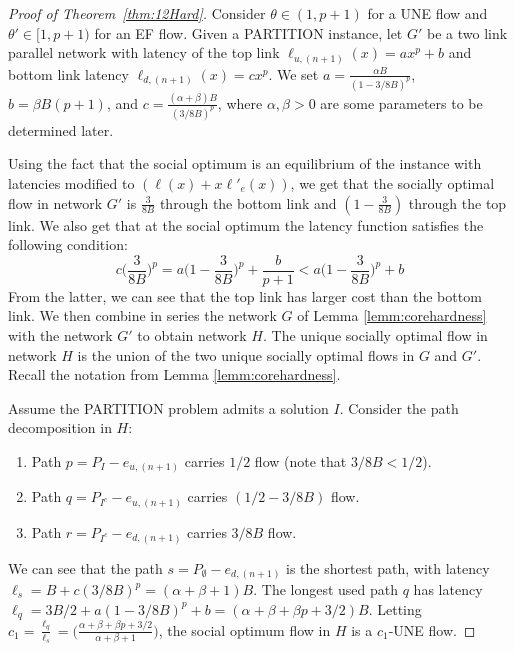 \begin{proof}[Proof of Theorem~\ref{thm:12Hard}]
Consider $\theta \in (1,p+1)$ for a UNE flow and $\theta' \in [1,p+1)$ for an EF flow. Given a PARTITION instance, let $G'$ be a two link parallel network with latency of the top link $\ell_{u,(n+1)}(x) = ax^p+b$ and bottom link latency $\ell_{d,(n+1)}(x) = cx^p$. We set $a=\frac{\alpha B}{(1-3/8B)^p}$, $b=\beta B(p+1)$, and $c=\frac{(\alpha+\beta)B}{(3/8B)^p}$, where $\alpha,\beta>0$ are some parameters to be determined later.

Using the fact that the social optimum is an equilibrium of the instance with latencies modified to $(\ell(x) + x\ell'_e(x))$, we  get that the socially optimal flow in network $G'$ is $\frac{3}{8B}$ through the bottom link and $(1-\frac{3}{8B})$ through the top link. We also get that at the social optimum the latency function satisfies the following condition:
$$
c\bigg(\frac{3}{8B}\bigg)^p = a\bigg(1-\frac{3}{8B}\bigg)^p + \frac{b}{p+1} < a\bigg(1-\frac{3}{8B}\bigg)^p + b
$$
From the latter, we can see that the top link has larger cost than the bottom link.  We then combine in series the network $G$ of Lemma \ref{lemm:corehardness} with the network $G'$ to obtain network $H$. The unique socially optimal flow in  network $H$ is the union of the two unique socially optimal flows in $G$ and $G'$. Recall the notation from Lemma \ref{lemm:corehardness}.

Assume the PARTITION problem admits a solution $I$. Consider the path decomposition in $H$:
\begin{enumerate}
	\item Path $p = P_{I}-e_{u, (n+1)}$ carries $1/2$ flow (note that $3/8B < 1/2$).
	\item Path $q = P_{I^c}-e_{u, (n+1)}$ carries $(1/2 - 3/8B)$ flow.
	\item Path $r = P_{I^c}-e_{d, (n+1)}$ carries $3/8B$ flow.
\end{enumerate}
We can see that the path $s = P_{\emptyset}-e_{d, (n+1)}$ is the shortest path, with latency $\ell_{s} = B + c(3/8B)^p = (\alpha+\beta+1)B$.  The longest used path $q$ has latency $\ell_{q} = 3B/2 + a(1-3/8B)^p + b = (\alpha+\beta+\beta p+3/2)B$.  Letting $c_1 = \frac{\ell_{q}}{ \ell_{s}}=\bigg(\frac{\alpha+\beta+\beta p+3/2}{\alpha+\beta+1}\bigg)$, the social optimum flow in $H$ is a $c_1$-UNE flow.


\end{proof}
